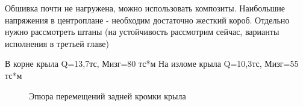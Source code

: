 

Обшивка почти не нагружена, можно использовать композиты. Наибольшие напряжения в центроплане - необходим достаточно жесткий короб. Отдельно нужно рассмотреть штаны (на устойчивость рассмотрим сейчас, варианты исполнения в третьей главе) 

В корне крыла Q=13,7тс, Мизг=80 тс*м
На изломе крыла Q=10,3тс, Мизг=55 тс*м



\begin{figure}[H]
\centering
\def\svgwidth{0.9\textwidth}

\caption{Эпюра перемещений задней кромки крыла}
\label{fig:WingDeformation}
\end{figure}


%

